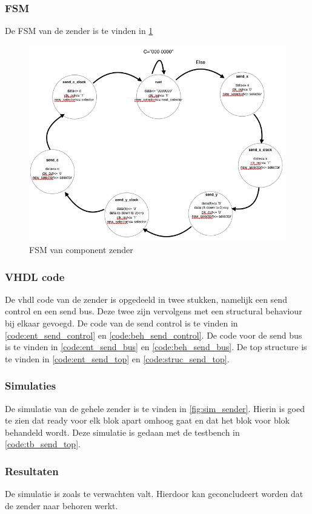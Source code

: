 \subsubsection{FSM}
De FSM van de zender is te vinden in \ref{fig:fsm_zender}
\begin{figure}[h!]
	\center
	\includegraphics[width = 15cm]{Figuren/LCD/fsm_sender.png}
	\caption{FSM van component zender}
	\label{fig:fsm_zender}
\end{figure}

\subsubsection{VHDL code}
De vhdl code van de zender is opgedeeld in twee stukken, namelijk een send control en een send bus. Deze twee zijn vervolgens met een structural behaviour bij elkaar gevoegd. De code van de send control is te vinden in \ref{code:ent_send_control} en \ref{code:beh_send_control}. De code voor de send bus is te vinden in \ref{code:ent_send_bus} en \ref{code:beh_send_bus}. De top structure is te vinden in \ref{code:ent_send_top} en \ref{code:struc_send_top}.

\subsubsection{Simulaties}
De simulatie van de gehele zender is te vinden in \ref{fig:sim_sender}. Hierin is goed te zien dat ready voor elk blok apart omhoog gaat en dat het blok voor blok behandeld wordt. Deze simulatie is gedaan met de testbench in \ref{code:tb_send_top}.

\subsubsection{Resultaten}
De simulatie is zoals te verwachten valt. Hierdoor kan geconcludeert worden dat de zender naar behoren werkt.